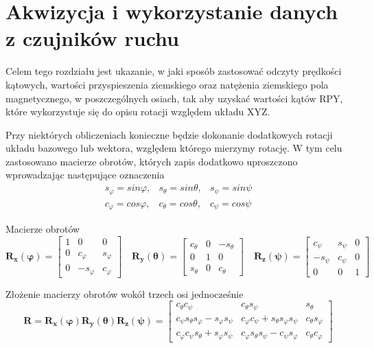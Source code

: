 \chapter{Akwizycja i wykorzystanie danych z czujników ruchu}

Celem tego rozdziału jest ukazanie, w jaki sposób zastosować odczyty prędkości kątowych, wartości przyspieszenia ziemskiego oraz natężenia ziemskiego pola magnetycznego, w poszczególnych osiach, tak aby uzyskać wartości kątów RPY, które wykorzystuje się do opisu rotacji względem układu XYZ. 

Przy niektórych obliczeniach konieczne będzie dokonanie dodatkowych rotacji układu bazowego lub wektora, względem którego mierzymy rotację. W tym celu zastosowano macierze obrotów, których zapis dodatkowo uproszczono wprowadzając następujące oznaczenia
$$
    \begin{array}{ccc}
        s_{\varphi} = sin\varphi, & s_{\theta} = sin\theta, & s_{\psi} = sin\psi \\
        c_{\varphi} = cos\varphi, & c_{\theta} = cos\theta, & c_{\psi} = cos\psi
    \end{array}
$$

Macierze obrotów
$$
    \mathbf{R_x(\varphi)} =
    \left[
        \begin{array}{ccc}
            1 & 0 & 0 \\
            0 & c_{\varphi} & s_{\varphi} \\
            0 & -s_{\varphi} & c_{\varphi}
        \end{array}
    \right]
    \quad
    \mathbf{R_y(\theta)} =
    \left[
        \begin{array}{ccc}
            c_{\theta} & 0 & -s_{\theta} \\
            0 & 1 & 0 \\
            s_{\theta} & 0 & c_{\theta}
        \end{array}
    \right]
    \quad
    \mathbf{R_z(\psi)} =
    \left[
        \begin{array}{ccc}
            c_{\psi} & s_{\psi} & 0 \\
            -s_{\psi} & c_{\psi} & 0 \\
            0 & 0 & 1
        \end{array}
    \right]
$$

Złożenie macierzy obrotów wokół trzech osi jednocześnie
$$
    \mathbf{R} =
    \mathbf{R_x(\varphi)R_y(\theta)R_z(\psi)} =
    \left[
        \begin{array}{ccc}
            c_{\theta}c_{\psi} & c_{\theta}s_{\psi} & s_{\theta} \\
            c_{\psi}s_{\theta}s_{\varphi} - s_{\varphi}s_{\psi} & c_{\varphi}c_{\psi} + s_{\theta}s_{\varphi}s_{\psi} & c_{\theta}s_{\varphi} \\
            c_{\varphi}c_{\psi}s_{\theta} + s_{\varphi}s_{\psi} & c_{\varphi}s_{\theta}s_{\psi} - c_{\psi}s_{\varphi} & c_{\theta}c_{\varphi}
        \end{array}
    \right]
$$
